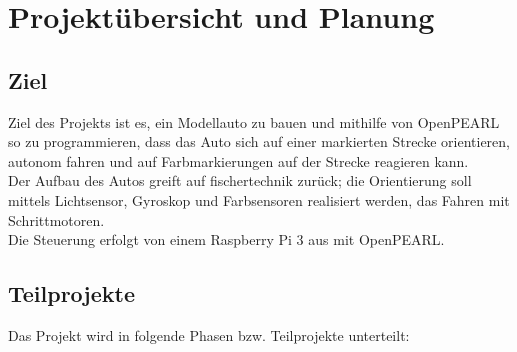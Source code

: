 \chapter{Projektübersicht und Planung}
\section{Ziel}
	Ziel des Projekts ist es, ein Modellauto zu bauen und mithilfe von OpenPEARL so zu programmieren, dass das Auto sich auf einer markierten Strecke orientieren, autonom fahren und auf Farbmarkierungen auf der Strecke reagieren kann.\\
	Der Aufbau des Autos greift auf fischertechnik zurück; die Orientierung soll mittels Lichtsensor, Gyroskop und Farbsensoren realisiert werden, das Fahren mit Schrittmotoren.\\
	Die Steuerung erfolgt von einem Raspberry Pi 3 aus mit OpenPEARL.
	
	\section{Teilprojekte}
	Das Projekt wird in folgende Phasen bzw. Teilprojekte unterteilt:
	
